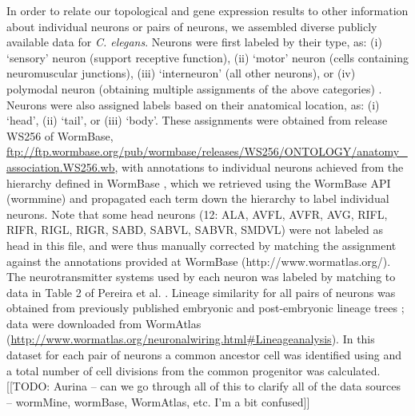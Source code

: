 \documentclass[10pt,letterpaper]{article}
\begin{document}
In order to relate our topological and gene expression results to other information about individual neurons or pairs of neurons, we assembled diverse publicly available data for \emph{C. elegans}.
Neurons were first labeled by their type, as:
(i) `sensory' neuron (support receptive function),
(ii) `motor' neuron (cells containing neuromuscular junctions),
(iii) `interneuron' (all other neurons), or
(iv) polymodal neuron (obtaining multiple assignments of the above categories) \cite{White:1986tx}.
Neurons were also assigned labels based on their anatomical location, as:
(i) `head', (ii) `tail', or (iii) `body'.
These assignments were obtained from release WS256 of WormBase, \url{ftp://ftp.wormbase.org/pub/wormbase/releases/WS256/ONTOLOGY/anatomy_association.WS256.wb}, with annotations to individual neurons achieved from the hierarchy defined in WormBase \cite{Harris:2009kd}, which we retrieved using the WormBase API (wormmine) and propagated each term down the hierarchy to label individual neurons.
Note that some head neurons (12: ALA, AVFL, AVFR, AVG, RIFL, RIFR, RIGL, RIGR, SABD, SABVL, SABVR, SMDVL) were not labeled as head in this file, and were thus manually corrected by matching the assignment against the annotations provided at WormBase (http://www.wormatlas.org/).
The neurotransmitter systems used by each neuron was labeled by matching to data in Table 2 of Pereira et al. \cite{Pereira:2015er}.
Lineage similarity for all pairs of neurons was obtained from previously published embryonic and  post-embryonic lineage trees \citep{Sulston1977, Sulston1983}; data were downloaded from WormAtlas (\url{http://www.wormatlas.org/neuronalwiring.html#Lineageanalysis}).
In this dataset for each pair of neurons a common ancestor cell was identified using and a total number of cell divisions from the common progenitor was calculated.
[[TODO: Aurina -- can we go through all of this to clarify all of the data sources -- wormMine, wormBase, WormAtlas, etc. I'm a bit confused]]

\end{document}
